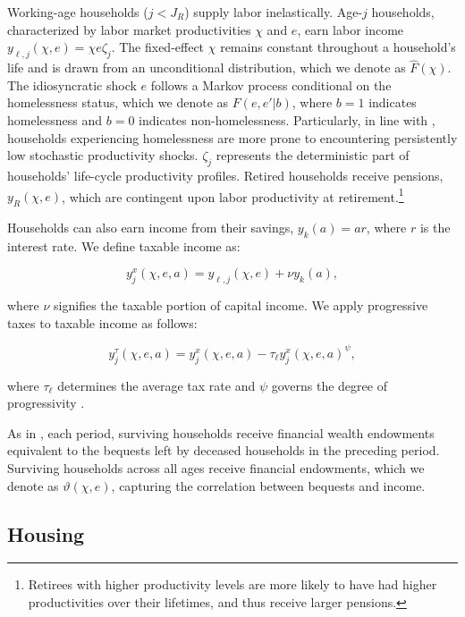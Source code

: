 \documentclass[parskip=full]{article}
\begin{document}
Working-age households ($j<J_{R}$) supply labor inelastically. Age-$j$ households, characterized by labor market productivities $\chi$ and $e$, earn labor income $y_{\ell,j}(\chi,e)=\chi e\zeta_j$. The fixed-effect $\chi$ remains constant throughout a household's life and is drawn from an unconditional distribution, which we denote as $\hat{F}(\chi)$. The idiosyncratic shock $e$ follows a Markov process conditional on the homelessness status, which we denote as $F(e,e'|b)$, where $b=1$ indicates homelessness and $b=0$ indicates non-homelessness. Particularly, in line with \citet{az-2024}, households experiencing homelessness are more prone to encountering persistently low stochastic productivity shocks. $\zeta_j$ represents the deterministic part of households' life-cycle productivity profiles. Retired households receive pensions, $y_{R}(\chi,e)$, which are contingent upon labor productivity at retirement.\footnote{Retirees with higher productivity levels are more likely to have had higher productivities over their lifetimes, and thus receive larger pensions.}

Households can also earn income from their savings, $y_{k}(a)=ar$, where $r$ is the interest rate. We define taxable income as:

\begin{equation*}\label{eq:taxable_labor_income}
  y^{x}_{j}(\chi,e,a) =y_{\ell,j}(\chi,e)+\nu y_{k}(a),
\end{equation*}

\noindent where $\nu$ signifies the taxable portion of capital income. We apply progressive taxes to taxable income as follows:

\begin{equation}\label{eq:income_tax}
  y^{\tau}_{j}(\chi,e,a) = y^{x}_{j}(\chi,e,a)-\tau_{\ell}y^{x}_{j}(\chi,e,a)^{\psi},
\end{equation}

\noindent where $\tau_{\ell}$ determines the average tax rate and $\psi$ governs the degree of progressivity \citep{hsv-2020}.

As in \citet{kkk-2021}, each period, surviving households receive financial wealth endowments equivalent to the bequests left by deceased households in the preceding period. Surviving households across all ages receive financial endowments, which we denote as $\vartheta (\chi,e)$, capturing the correlation between bequests and income.

\subsection{Housing}\label{subsection:housing_choice}
\end{document}
